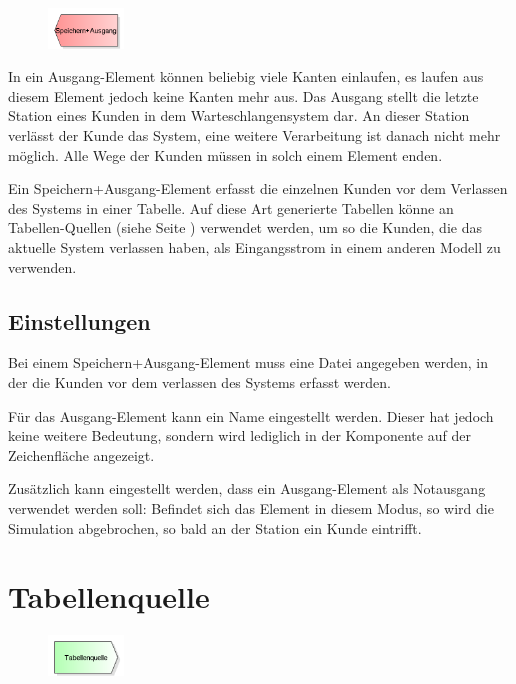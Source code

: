 \begin{figure}
\vspace{-22pt}
\includegraphics[width=2cm]{imageModelElementDisposeWithTable.png}
\vspace{-22pt}
\end{figure}

In ein Ausgang-Element können beliebig viele Kanten einlaufen, es laufen aus diesem Element jedoch keine Kanten mehr aus.
Das Ausgang stellt die letzte Station eines Kunden in dem Warteschlangensystem dar. An dieser Station verlässt der Kunde
das System, eine weitere Verarbeitung ist danach nicht mehr möglich. Alle Wege der Kunden müssen in solch einem Element enden.

Ein Speichern+Ausgang-Element erfasst die einzelnen Kunden vor dem Verlassen des Systems in einer Tabelle. Auf diese Art
generierte Tabellen könne an Tabellen-Quellen (siehe Seite \pageref{ref:ModelElementSourceTable}) verwendet werden, um so die
Kunden, die das aktuelle System verlassen haben, als Eingangsstrom in einem anderen Modell zu verwenden.

\subsection*{Einstellungen}

Bei einem Speichern+Ausgang-Element muss eine Datei angegeben werden, in der die Kunden vor dem verlassen des Systems erfasst werden.

Für das Ausgang-Element kann ein Name eingestellt werden. Dieser hat jedoch keine weitere Bedeutung, sondern wird lediglich
in der Komponente auf der Zeichenfläche angezeigt.

Zusätzlich kann eingestellt werden, dass ein Ausgang-Element als Notausgang verwendet werden soll: Befindet sich das Element
in diesem Modus, so wird die Simulation abgebrochen, so bald an der Station ein Kunde eintrifft.


\section{Tabellenquelle}
\label{ref:ModelElementSourceTable}

\begin{figure}
\vspace{-22pt}
\includegraphics[width=2cm]{imageModelElementSourceTable.png}
\vspace{-22pt}
\end{figure}

